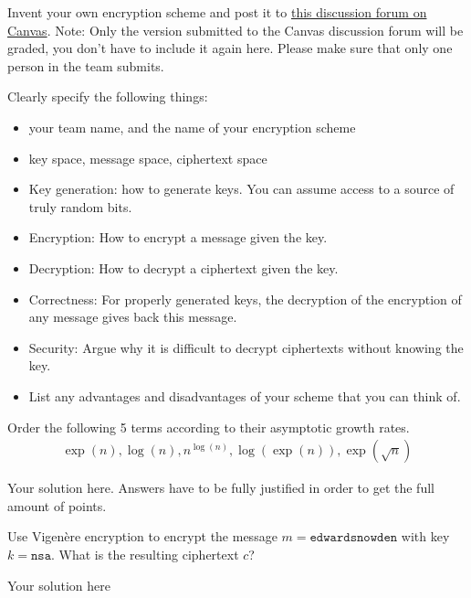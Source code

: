 \documentclass[a4paper,10pt]{article}
\begin{document}

\begin{groupproject}{10}
Invent your own encryption scheme and post it to \href{https://canvas.uva.nl/courses/10514/discussion_topics/76835?module_item_id=282332}{this discussion forum on Canvas}.
Note: Only the version submitted to the Canvas discussion forum will be graded, you don’t have to include it again here. Please make sure that only one person in the team submits.

Clearly specify the following things:
\begin{itemize}
\item your team name, and the name of your encryption scheme
\item key space, message space, ciphertext space
\item Key generation: how to generate keys. You can assume access to a source of truly random bits.
\item Encryption: How to encrypt a message given the key.
\item Decryption: How to decrypt a ciphertext given the key.
\item Correctness: For properly generated keys, the decryption of the encryption of any message gives back this message.
\item Security: Argue why it is difficult to decrypt ciphertexts without knowing the key.
\item List any advantages and disadvantages of your scheme that you can think of.
\end{itemize}
\end{groupproject}


\begin{question}{1}
Order the following 5 terms according to their asymptotic growth
rates.
\begin{align*}
\exp(n), \log(n), n^{\log(n)}, \log(\exp(n)), \exp(\sqrt{n})
\end{align*}
\end{question}

\begin{solution}
  Your solution here. Answers have to be fully justified in order to get the full amount of points.
\end{solution}

\begin{question}{1}
  Use Vigenère encryption to encrypt the message $m =
  \mathtt{edwardsnowden}$ with key $k = \mathtt{nsa}$. What is the
  resulting ciphertext $c$?
\end{question}
\begin{solution}
  Your solution here
\end{solution}
\end{document}
